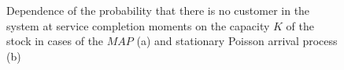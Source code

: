 \documentclass[12pt, a4paper]{article}
\begin{document}
\begin{figure}[h]
\begin{minipage}[h]{0.49\linewidth}
\end{minipage}
\caption{Dependence of the probability that there is no customer in the system at service completion moments on the capacity $K$ of the stock
in cases of the $MAP$ (a) and stationary Poisson arrival process (b)}
\end{figure}

\begin{figure}[h]
\begin{minipage}[h]{0.49\linewidth}
\end{minipage}
\hfill
\begin{minipage}[h]{0.49\linewidth}

\end{minipage}
\end{figure}
\end{document}
